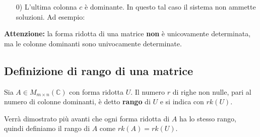 \documentclass[a4paper]{article}
\theoremstyle{break}
\theoremstyle{break}
\theoremstyle{break}
\theoremstyle{break}
\begin{document}
\begin{enumerate}
\begin{figure}[H]
\end{figure}
\item[0)] L'ultima colonna \( c \) è dominante. In questo tal caso il sistema non ammette
soluzioni. Ad esempio:
\begin{figure}[H]
  \centering
\end{figure}
\end{enumerate}

\noindent \textbf{Attenzione:} la forma ridotta di una matrice \textbf{non} è unicovamente
determinata, ma le colonne dominanti sono univocamente determinate.

\subsection{Definizione di rango di una matrice}
\begin{definition}
Sia \( A \in M_{m \times n}(\mathbb{C}) \) con forma ridotta \( U \). Il numero \( r \) di righe non
nulle, pari al numero di colonne dominanti, è detto \textbf{rango} di \( U \) e si indica
con \( rk(U) \).
\end{definition}
Verrà dimostrato più avanti che ogni forma ridotta di \( A \) ha lo stesso rango, quindi
definiamo il rango di \( A \) come \( rk(A) = rk(U) \).
\end{document}
